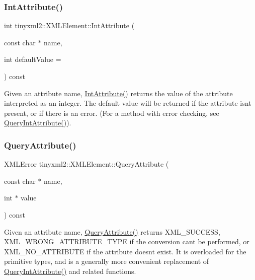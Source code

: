 \subsubsection{\texorpdfstring{IntAttribute()}{IntAttribute()}}
{\footnotesize\ttfamily int tinyxml2\+::\+X\+M\+L\+Element\+::\+Int\+Attribute (\begin{DoxyParamCaption}\item[{const char $\ast$}]{name,  }\item[{int}]{default\+Value = {} }\end{DoxyParamCaption}) const}

Given an attribute name, \mbox{\hyperlink{classtinyxml2_1_1XMLElement_a95a89b13bb14a2d4655e2b5b406c00d4}{Int\+Attribute()}} returns the value of the attribute interpreted as an integer. The default value will be returned if the attribute isn\textquotesingle{}t present, or if there is an error. (For a method with error checking, see \mbox{\hyperlink{classtinyxml2_1_1XMLElement_a8a78bc1187c1c45ad89f2690eab567b1}{Query\+Int\+Attribute()}}). \mbox{\label{classtinyxml2_1_1XMLElement_a5b7df3bed2b8954eabf227fa204522eb}} 
\subsubsection{\texorpdfstring{QueryAttribute()}{QueryAttribute()}}
{\footnotesize\ttfamily X\+M\+L\+Error tinyxml2\+::\+X\+M\+L\+Element\+::\+Query\+Attribute (\begin{DoxyParamCaption}\item[{const char $\ast$}]{name,  }\item[{int $\ast$}]{value }\end{DoxyParamCaption}) const\hspace{0.3cm}{\ttfamily [inline]}}

Given an attribute name, \mbox{\hyperlink{classtinyxml2_1_1XMLElement_a5b7df3bed2b8954eabf227fa204522eb}{Query\+Attribute()}} returns X\+M\+L\+\_\+\+S\+U\+C\+C\+E\+SS, X\+M\+L\+\_\+\+W\+R\+O\+N\+G\+\_\+\+A\+T\+T\+R\+I\+B\+U\+T\+E\+\_\+\+T\+Y\+PE if the conversion can\textquotesingle{}t be performed, or X\+M\+L\+\_\+\+N\+O\+\_\+\+A\+T\+T\+R\+I\+B\+U\+TE if the attribute doesn\textquotesingle{}t exist. It is overloaded for the primitive types, and is a generally more convenient replacement of \mbox{\hyperlink{classtinyxml2_1_1XMLElement_a8a78bc1187c1c45ad89f2690eab567b1}{Query\+Int\+Attribute()}} and related functions.

